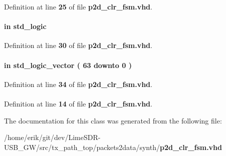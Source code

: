 Definition at line {\bf 25} of file {\bf p2d\+\_\+clr\+\_\+fsm.\+vhd}.

\paragraph[{reset\+\_\+n}]{ {\bfseries \textcolor{keywordflow}{in}\textcolor{vhdlchar}{ }} {\bfseries \textcolor{comment}{std\+\_\+logic}\textcolor{vhdlchar}{ }} \hspace{0.3cm}{\ttfamily [Port]}}\label{classp2d__clr__fsm_a446ea52ed8c4a84181a47d9165ce41a5}


Definition at line {\bf 30} of file {\bf p2d\+\_\+clr\+\_\+fsm.\+vhd}.

\paragraph[{smpl\+\_\+nr}]{ {\bfseries \textcolor{keywordflow}{in}\textcolor{vhdlchar}{ }} {\bfseries \textcolor{comment}{std\+\_\+logic\+\_\+vector}\textcolor{vhdlchar}{ }\textcolor{vhdlchar}{(}\textcolor{vhdlchar}{ }\textcolor{vhdlchar}{ } \textcolor{vhdldigit}{63} \textcolor{vhdlchar}{ }\textcolor{keywordflow}{downto}\textcolor{vhdlchar}{ }\textcolor{vhdlchar}{ } \textcolor{vhdldigit}{0} \textcolor{vhdlchar}{ }\textcolor{vhdlchar}{)}\textcolor{vhdlchar}{ }} \hspace{0.3cm}{\ttfamily [Port]}}\label{classp2d__clr__fsm_a6ea92059bac477bfe9a5679da537fec5}


Definition at line {\bf 34} of file {\bf p2d\+\_\+clr\+\_\+fsm.\+vhd}.

\paragraph[{std\+\_\+logic\+\_\+1164}]{\hspace{0.3cm}{\ttfamily [Package]}}\label{classp2d__clr__fsm_acd03516902501cd1c7296a98e22c6fcb}


Definition at line {\bf 14} of file {\bf p2d\+\_\+clr\+\_\+fsm.\+vhd}.



The documentation for this class was generated from the following file\+:\begin{DoxyCompactItemize}
\item 
/home/erik/git/dev/\+Lime\+S\+D\+R-\/\+U\+S\+B\+\_\+\+G\+W/src/tx\+\_\+path\+\_\+top/packets2data/synth/{\bf p2d\+\_\+clr\+\_\+fsm.\+vhd}\end{DoxyCompactItemize}
